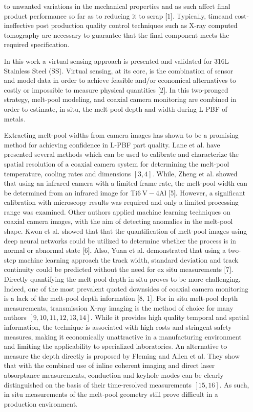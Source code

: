 \documentclass[10pt]{article}
\begin{document}
to unwanted variations in the mechanical properties and as such affect final product performance so far as to reducing it to scrap [1]. Typically, timeand cost-ineffective post production quality control techniques such as X-ray computed tomography are necessary to guarantee that the final component meets the required specification.

In this work a virtual sensing approach is presented and validated for 316L Stainless Steel (SS). Virtual sensing, at its core, is the combination of sensor\\
and model data in order to achieve feasible and/or economical alternatives to costly or impossible to measure physical quantities [2]. In this two-pronged strategy, melt-pool modeling, and coaxial camera monitoring are combined in order to estimate, in situ, the melt-pool depth and width during L-PBF of metals.

Extracting melt-pool widths from camera images has shown to be a promising method for achieving confidence in L-PBF part quality. Lane et al. have presented several methods which can be used to calibrate and characterize the spatial resolution of a coaxial camera system for determining the melt-pool temperature, cooling rates and dimensions $[3,4]$. While, Zheng et al. showed that using an infrared camera with a limited frame rate, the melt-pool width can be determined from an infrared image for Ti$6 \mathrm{~V}-4 \mathrm{Al}$ [5]. However, a significant calibration with microscopy results was required and only a limited processing range was examined. Other authors applied machine learning techniques on coaxial camera images, with the aim of detecting anomalies in the melt-pool shape. Kwon et al. showed that that the quantification of melt-pool images using deep neural networks could be utilized to determine whether the process is in normal or abnormal state [6]. Also, Yuan et al. demonstrated that using a two-step machine learning approach the track width, standard deviation and track continuity could be predicted without the need for ex situ measurements [7]. Directly quantifying the melt-pool depth in situ proves to be more challenging. Indeed, one of the most prevalent quoted downsides of coaxial camera monitoring is a lack of the melt-pool depth information [8, 1]. For in situ melt-pool depth\\
measurements, transmission X-ray imaging is the method of choice for many authors $[9,10,11,12,13,14]$. While it provides high quality temporal and spatial information, the technique is associated with high costs and stringent safety measures, making it economically unattractive in a manufacturing environment and limiting the applicability to specialized laboratories. An alternative to measure the depth directly is proposed by Fleming and Allen et al. They show that with the combined use of inline coherent imaging and direct laser absorptance measurements, conduction and keyhole modes can be clearly distinguished on the basis of their time-resolved measurements $[15,16]$. As such, in situ measurements of the melt-pool geometry still prove difficult in a production environment.
\end{document}
